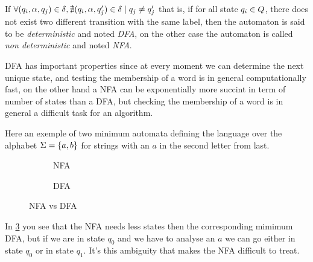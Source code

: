 If $\forall (q_i, \alpha, q_j) \in \delta{}, \nexists (q_i, \alpha, q_j') \in \delta{} \mid q_j \neq q_j'$ that is, if for all state $q_i \in Q{}$, there does not exist two different transition with the same label, then the automaton is said to be \textit{deterministic} and noted \textit{DFA}, on the other case the automaton is called \textit{non deterministic} and noted \textit{NFA}.

DFA has important properties since at every moment we can determine the next unique state, and testing the membership of a word is in general computationally fast, on the other hand a NFA can be exponentially more succint in term of number of states than a DFA, but checking the membership of a word is in general a difficult task for an algorithm.

\begin{exmp}
  Here an exemple of two minimum automata defining the language over the alphabet $\Sigma{} = \{a, b\}$ for strings with an $a$ in the second letter from last.
  \begin{figure}[H]
    \centering
    \begin{subfigure}[b]{0.45\textwidth}
      \centering
      \caption{NFA}
      \label{subfig:nfa_x_star_ax}
    \end{subfigure}
    \begin{subfigure}[b]{0.45\textwidth}
      \centering
      \caption{DFA}
      \label{subfig:dfa_x_star_ax}
    \end{subfigure}
    \caption{NFA vs DFA}
    \label{fig:nfa_vs_dfa}
  \end{figure}
  In \cref{fig:nfa_vs_dfa} you see that the NFA needs less states then the corresponding mimimum DFA, but if we are in state $q_0$ and we have to analyse an $a$ we can go either in state $q_0$ or in state $q_1$. It's this ambiguity that makes the NFA difficult to treat.
\end{exmp}

